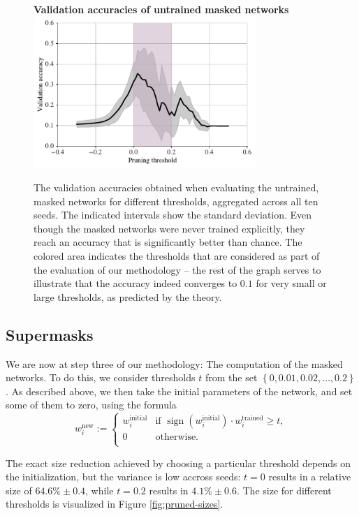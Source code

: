 \documentclass[12pt,final,twoside]{article}
\theoremstyle{plain}
\theoremstyle{definition}
\theoremstyle{remark}
\theoremstyle{named}
\begin{document}
\begin{figure}[t]
  \centering
  \textbf{Validation accuracies of untrained masked networks}
  \includegraphics[width=0.75\textwidth]{plots/pruned_accuracies.pdf}
  \caption{The validation accuracies obtained when evaluating the untrained, masked networks for different thresholds, aggregated across all ten seeds. The indicated intervals show the standard deviation. Even though the masked networks were never trained explicitly, they reach an accuracy that is significantly better than chance. The colored area indicates the thresholds that are considered as part of the evaluation of our methodology -- the rest of the graph serves to illustrate that the accuracy indeed converges to $0.1$ for very small or large thresholds, as predicted by the theory.}
  \label{fig:pruned-accuracies}
\end{figure}

\subsection{Supermasks}

We are now at step three of our methodology: The computation of the masked networks. To do this, we consider thresholds $t$ from the set $\left\{0, 0.01, 0.02, \ldots, 0.2\right\}$. As described above, we then take the initial parameters of the network, and set some of them to zero, using the formula
$$
w_i^{\text{new}} := \begin{cases}
w_i^{\text{initial}} & \text{if } \operatorname{sign}\left(w_i^{\text{initial}} \right) \cdot w_i^{\text{trained}} \geq t, \\ 
0 & \text{otherwise.} \\
\end{cases}
$$

The exact size reduction achieved by choosing a particular threshold depends on the initialization, but the variance is low accross seeds: $t=0$ results in a relative size of $64.6\% \pm 0.4$, while $t=0.2$ results in $4.1\% \pm 0.6$. The size for different thresholds is visualized in Figure \ref{fig:pruned-sizes}.
\end{document}
